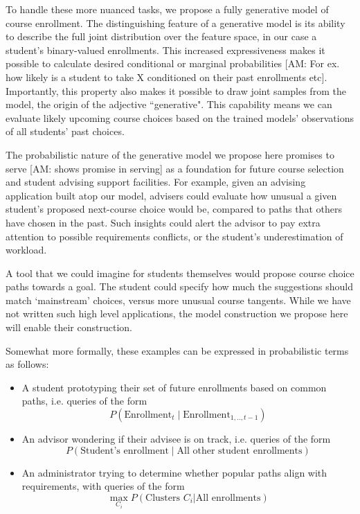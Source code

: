 \documentclass{edm_template}
\providecommand{\am}[1]{{\color{blue} [AM: #1]}}
\begin{document}
To handle these more nuanced tasks, we propose a fully generative model of course enrollment. The distinguishing feature of a generative model is its ability to describe the full joint distribution over the feature space, in our case a student's binary-valued enrollments. This increased expressiveness makes it possible to calculate desired conditional or marginal probabilities \am{For ex. how likely is a student to take X conditioned on their past enrollments etc}.  Importantly, this property also makes it possible to draw joint samples from the model, the origin of the adjective ``generative". This capability means we can evaluate likely upcoming course choices based on the trained models' observations of all students' past choices.

The probabilistic nature of the generative model we propose here promises to serve \am{shows promise in serving} as a foundation for future course selection and student advising support facilities. For example, given an advising application built atop our model, advisers could evaluate how unusual a given student's proposed next-course choice would be, compared to paths that others have chosen in the past. Such insights could alert the advisor to pay extra attention to possible requirements conflicts, or the student's underestimation of workload.

A tool that we could imagine for students themselves would propose course choice paths towards a goal. The student could specify how much the suggestions should match `mainstream' choices, versus more unusual course tangents. While we have not written such high level applications, the model construction we propose here will enable their construction.

Somewhat more formally, these examples can be expressed in probabilistic terms as follows:

\begin{itemize}[noitemsep,topsep=0pt]
	\item A student prototyping their set of future enrollments based on common paths, i.e. queries of the form
	$$P(\text{Enrollment}_t \mid \text{Enrollment}_{1,..,t-1})$$ 
	\item An advisor wondering if their advisee is on track, i.e. queries of the form
	$$P(\text{Student's enrollment} \mid \text{All other student enrollments})$$
    \item An administrator trying to determine whether popular paths align with requirements, with queries of the form 
	$$\max_{C_i} P(\text{Clusters } C_i | \text{All enrollments})$$
\end{itemize}
\end{document}

